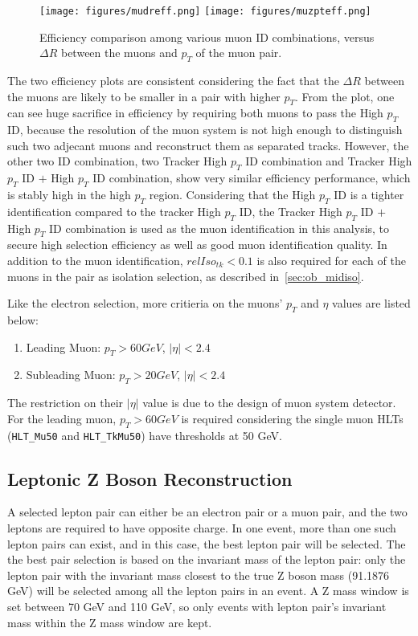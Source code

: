 \begin{figure}[htbp]
\begin{center}
\texttt{[image: figures/mudreff.png]}
\texttt{[image: figures/muzpteff.png]}
\caption{Efficiency comparison among various muon ID combinations, versus $\Delta R$ between the muons and $p_T$ of the muon pair.}
\label{fig:sel_mumueff}
\end{center}
\end{figure}

\vspace{0.3cm}
The two efficiency plots are consistent considering the fact that the $\Delta R$ between the muons are likely to be smaller in a pair with higher $p_T$. From the plot, one can see huge sacrifice in efficiency by requiring both muons to pass the High $p_T$ ID, because the resolution of the muon system is not high enough to distinguish such two adjecant muons and reconstruct them as separated tracks. However, the other two ID combination, two Tracker High $p_T$ ID combination and Tracker High $p_T$ ID $+$ High $p_T$ ID combination, show very similar efficiency performance, which is stably high in the high $p_T$ region. Considering that the High $p_T$ ID is a tighter identification compared to the tracker High $p_T$ ID, the Tracker High $p_T$ ID $+$ High $p_T$ ID combination is used as the muon identification in this analysis, to secure high selection efficiency as well as good muon identification quality. In addition to the muon identification, $relIso_{tk}<0.1$ is also required for each of the muons in the pair as isolation selection, as described in~\ref{sec:ob_midiso}.

\vspace{0.3cm}
Like the electron selection, more critieria on the muons' $p_T$ and $\eta$ values are listed below:
\begin{enumerate}
\item Leading Muon: $p_T >60 GeV$, $|\eta|<2.4$
\item Subleading Muon: $p_T >20 GeV$, $|\eta|<2.4$
\end{enumerate}

The restriction on their $|\eta|$ value is due to the design of muon system detector. For the leading muon, $p_T >60 GeV$ is required considering the single muon HLTs (\texttt{HLT\_Mu50} and \texttt{HLT\_TkMu50}) have thresholds at 50 GeV.

\subsection{Leptonic Z Boson Reconstruction}
A selected lepton pair can either be an electron pair or a muon pair, and the two leptons are required to have opposite charge. In one event, more than one such lepton pairs can exist, and in this case, the best lepton pair will be selected. The the best pair selection is based on the invariant mass of the lepton pair: only the lepton pair with the invariant mass closest to the true Z boson mass (91.1876 GeV) will be selected among all the lepton pairs in an event. A Z mass window is set between 70 GeV and 110 GeV, so only events with lepton pair's invariant mass within the Z mass window are kept.

